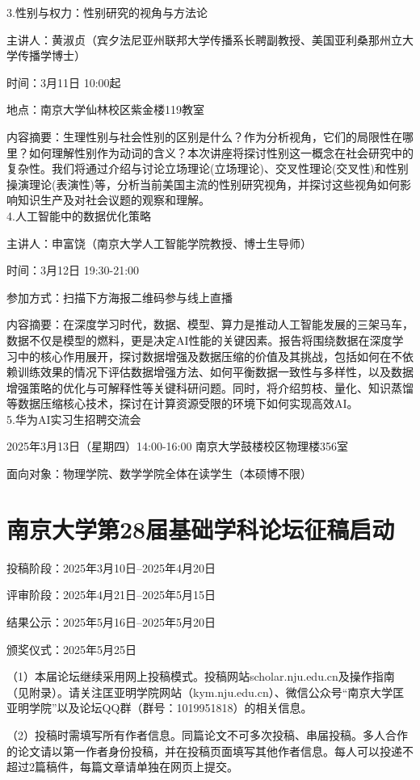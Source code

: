 \documentclass[letterpaper, 12pt]{article}
\begin{document}
\begin{multicols}{2}
3.性别与权力：性别研究的视角与方法论

主讲人：黄淑贞（宾夕法尼亚州联邦大学传播系长聘副教授、美国亚利桑那州立大学传播学博士）

时间：3月11日 10:00起

地点：南京大学仙林校区紫金楼119教室

内容摘要：生理性别与社会性别的区别是什么？作为分析视角，它们的局限性在哪里？如何理解性别作为动词的含义？本次讲座将探讨性别这一概念在社会研究中的复杂性。我们将通过介绍与讨论立场理论(立场理论)、交叉性理论(交叉性)和性别操演理论(表演性)等，分析当前美国主流的性别研究视角，并探讨这些视角如何影响知识生产及对社会议题的观察和理解。\\

4.人工智能中的数据优化策略

主讲人：申富饶（南京大学人工智能学院教授、博士生导师）

时间：3月12日 19:30-21:00

参加方式：扫描下方海报二维码参与线上直播

内容摘要：在深度学习时代，数据、模型、算力是推动人工智能发展的三架马车，数据不仅是模型的燃料，更是决定AI性能的关键因素。报告将围绕数据在深度学习中的核心作用展开，探讨数据增强及数据压缩的价值及其挑战，包括如何在不依赖训练效果的情况下评估数据增强方法、如何平衡数据一致性与多样性，以及数据增强策略的优化与可解释性等关键科研问题。同时，将介绍剪枝、量化、知识蒸馏等数据压缩核心技术，探讨在计算资源受限的环境下如何实现高效AI。\\

5.华为AI实习生招聘交流会

2025年3月13日（星期四）14:00-16:00 南京大学鼓楼校区物理楼356室

面向对象：物理学院、数学学院全体在读学生（本硕博不限）
\section{南京大学第28届基础学科论坛征稿启动}
投稿阶段：2025年3月10日--2025年4月20日

评审阶段：2025年4月21日--2025年5月15日

结果公示：2025年5月16日--2025年5月20日

颁奖仪式：2025年5月25日

（1）本届论坛继续采用网上投稿模式。投稿网站scholar.nju.edu.cn及操作指南（见附录）。请关注匡亚明学院网站（kym.nju.edu.cn）、微信公众号“南京大学匡亚明学院”以及论坛QQ群（群号：1019951818）的相关信息。

（2）投稿时需填写所有作者信息。同篇论文不可多次投稿、串届投稿。多人合作的论文请以第一作者身份投稿，并在投稿页面填写其他作者信息。每人可以投递不超过2篇稿件，每篇文章请单独在网页上提交。


\end{multicols}
\end{document}
